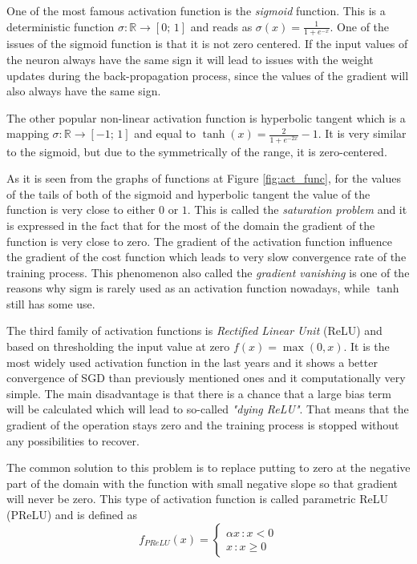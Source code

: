 One of the most famous activation function is the \emph{sigmoid} function.
This is a deterministic function $ \sigma : \mathbb{R} \rightarrow [0; \, 1] $ and reads as $ \sigma(x) = \frac{1}{1+e^{-x}} $.
One of the issues of the sigmoid function is that it is not zero centered.
If the input values of the neuron always have the same sign it will lead to issues with the weight updates during the back-propagation process, since the values of the gradient will also always have the same sign.
\medskip

The other popular non-linear activation function is hyperbolic tangent which is a mapping $ \sigma : \mathbb{R} \rightarrow [-1; \, 1]$ and equal to $\tanh(x)=\frac{2}{1+e^{-2x}}-1$.
It is very similar to the sigmoid, but due to the symmetrically of the range, it is zero-centered.
\medskip

As it is seen from the graphs of functions at Figure \ref{fig:act_func}, for the values of the tails of both of the sigmoid and hyperbolic tangent the value of the function is very close to either $0$ or $1$.
This is called the \emph{saturation problem} and it is expressed in the fact that for the most of the domain the gradient of the function is very close to zero.
The gradient of the activation function influence the gradient of the cost function which leads to very slow convergence rate of the training process.
This phenomenon also called the \emph{gradient vanishing} is one of the reasons why $\mathrm{sigm}$ is rarely used as an activation function nowadays, while $\tanh$ still has some use.
\medskip

The third family of activation functions is \emph{Rectified Linear Unit} (ReLU) and based on thresholding the input value at zero $f(x)=\max(0,x)$. 
It is the most widely used activation function in the last years and it shows a better convergence of SGD than previously mentioned ones and it computationally very simple.
The main disadvantage is that there is a chance that a large bias term will be calculated which will lead to so-called \emph{"dying ReLU"}. 
That means that the gradient of the operation stays zero and the training process is stopped without any possibilities to recover. 
\medskip

The common solution to this problem is to replace putting to zero at the negative part of the domain with the function with small negative slope so that gradient will never be zero. 
This type of activation function is called parametric ReLU (PReLU) and is defined as  
\[ f_{PReLU}(x) = 
\begin{cases}
\alpha x \, :x<0 \\
x \, : x \geq 0
\end{cases}
\]

